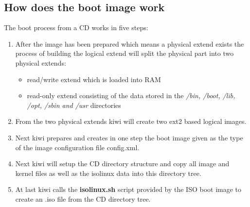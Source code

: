 \subsection{How does the boot image work}
The boot process from a CD works in five steps:

\begin{enumerate}
\item After the image has been prepared which means a physical extend
      exists the process of building the logical extend will split
      the physical part into two physical extends:
      \begin{itemize}
      \item read/write extend which is loaded into RAM
      \item read-only extend consisting of the data stored
            in the \textit{/bin, /boot, /lib, /opt, /sbin and /usr}
            directories
      \end{itemize}
\item From the two physical extends kiwi will create two ext2
      based logical images.
\item Next kiwi prepares and creates in one step the boot image given 
      as the type of the image configuration file config.xml.
\item Next kiwi will setup the CD directory structure and copy all
      image and kernel files as well as the isolinux data into this
      directory tree.
\item At last kiwi calls the \textbf{isolinux.sh} script provided
      by the ISO boot image to create an .iso file from the CD
      directory tree.
\end{enumerate}
